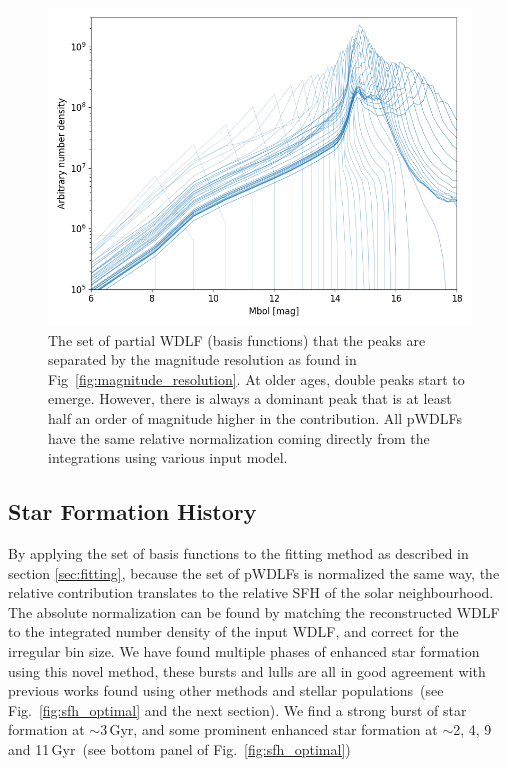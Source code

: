 \documentclass[fleqn,usenatbib]{mnras}
\begin{document}
\begin{figure}
    \includegraphics[width=\columnwidth]{figures/fig_04_basis_pwdlf.png}
    \caption{The set of partial WDLF (basis functions) that the peaks are
    separated by the magnitude resolution as found in
    Fig~\ref{fig:magnitude_resolution}. At older ages, double peaks start to
    emerge. However, there is always a dominant peak that is at least half an
    order of magnitude higher in the contribution. All pWDLFs have the same
    relative normalization coming directly from the integrations using various
    input model.}
    \label{fig:basis_pwdlf}
\end{figure}

\subsection{Star Formation History}

By applying the set of basis functions to the fitting method as described in
section \textsection\ref{sec:fitting}, because the set of pWDLFs is
normalized the same way, the relative contribution translates to the relative
SFH of the solar neighbourhood. The absolute normalization can be found by
matching the reconstructed WDLF to the integrated number density of the input
WDLF, and correct for the irregular bin size. We have found multiple phases of
enhanced star formation using this novel method, these bursts and lulls are all
in good agreement with previous works found using other methods and stellar 
populations~(see Fig.~\ref{fig:sfh_optimal} and the next section). We find a
strong burst of star formation at $\sim$3\,Gyr, and some prominent enhanced
star formation at $\sim$2, 4, 9 and 11\,Gyr~(see bottom panel of
Fig.~\ref{fig:sfh_optimal})
\end{document}

